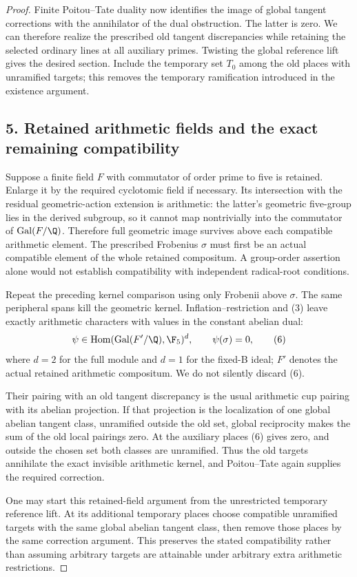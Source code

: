 \begin{proof}
Finite Poitou--Tate duality now identifies the image of global tangent corrections with the annihilator of the dual obstruction. The latter is zero. We can therefore realize the prescribed old tangent discrepancies while retaining the selected ordinary lines at all auxiliary primes. Twisting the global reference lift gives the desired section. Include the temporary set $T_0$ among the old places with unramified targets; this removes the temporary ramification introduced in the existence argument.

\subsection*{5. Retained arithmetic fields and the exact remaining compatibility}
Suppose a finite field $F$ with commutator of order prime to five is retained. Enlarge it by the required cyclotomic field if necessary. Its intersection with the residual geometric-action extension is arithmetic: the latter's geometric five-group lies in the derived subgroup, so it cannot map nontrivially into the commutator of $\operatorname{Gal}(F/\Q)$. Therefore full geometric image survives above each compatible arithmetic element. The prescribed Frobenius $\sigma$ must first be an actual compatible element of the whole retained compositum. A group-order assertion alone would not establish compatibility with independent radical-root conditions.

Repeat the preceding kernel comparison using only Frobenii above $\sigma$. The same peripheral spans kill the geometric kernel. Inflation--restriction and (3) leave exactly arithmetic characters with values in the constant abelian dual:
\[
 \psi\in\operatorname{Hom}(\operatorname{Gal}(F'/\Q),\F_5)^d,
 \qquad \psi(\sigma)=0,
 \tag{6}
\]
where $d=2$ for the full module and $d=1$ for the fixed-B ideal; $F'$ denotes the actual retained arithmetic compositum. We do not silently discard (6).

Their pairing with an old tangent discrepancy is the usual arithmetic cup pairing with its abelian projection. If that projection is the localization of one global abelian tangent class, unramified outside the old set, global reciprocity makes the sum of the old local pairings zero. At the auxiliary places (6) gives zero, and outside the chosen set both classes are unramified. Thus the old targets annihilate the exact invisible arithmetic kernel, and Poitou--Tate again supplies the required correction.

One may start this retained-field argument from the unrestricted temporary reference lift. At its additional temporary places choose compatible unramified targets with the same global abelian tangent class, then remove those places by the same correction argument. This preserves the stated compatibility rather than assuming arbitrary targets are attainable under arbitrary extra arithmetic restrictions.


\end{proof}
